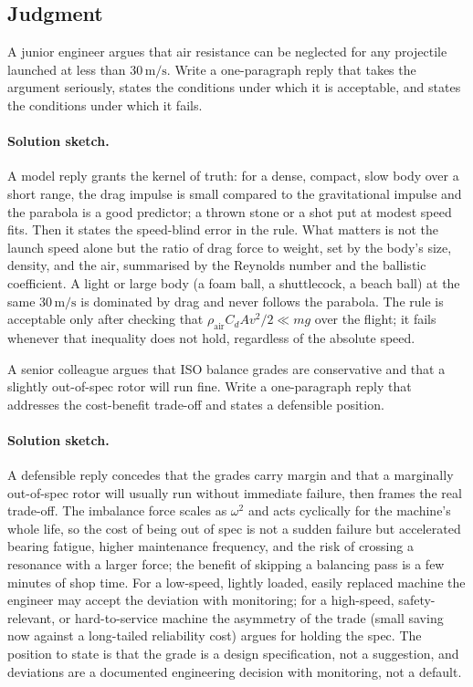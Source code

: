 \subsection*{Judgment}

\begin{exercise}
A junior engineer argues that air resistance can be neglected for any
projectile launched at less than $30\,\si{\meter\per\second}$. Write
a one-paragraph reply that takes the argument seriously, states the
conditions under which it is acceptable, and states the conditions
under which it fails.
\paragraph{Solution sketch.} A model reply grants the kernel of truth:
for a dense, compact, slow body over a short range, the drag impulse
is small compared to the gravitational impulse and the parabola is a
good predictor; a thrown stone or a shot put at modest speed fits.
Then it states the speed-blind error in the rule. What matters is not
the launch speed alone but the ratio of drag force to weight, set by
the body's size, density, and the air, summarised by the Reynolds
number and the ballistic coefficient. A light or large body (a foam
ball, a shuttlecock, a beach ball) at the same $30\,\si{\meter\per
\second}$ is dominated by drag and never follows the parabola. The
rule is acceptable only after checking that $\rho_{\text{air}}C_{d}A
v^{2}/2\ll mg$ over the flight; it fails whenever that inequality does
not hold, regardless of the absolute speed.
\end{exercise}

\begin{exercise}
A senior colleague argues that ISO balance grades are conservative
and that a slightly out-of-spec rotor will run fine. Write a
one-paragraph reply that addresses the cost-benefit trade-off and
states a defensible position.
\paragraph{Solution sketch.} A defensible reply concedes that the
grades carry margin and that a marginally out-of-spec rotor will
usually run without immediate failure, then frames the real
trade-off. The imbalance force scales as $\omega^{2}$ and acts
cyclically for the machine's whole life, so the cost of being out of
spec is not a sudden failure but accelerated bearing fatigue, higher
maintenance frequency, and the risk of crossing a resonance with a
larger force; the benefit of skipping a balancing pass is a few
minutes of shop time. For a low-speed, lightly loaded, easily replaced
machine the engineer may accept the deviation with monitoring; for a
high-speed, safety-relevant, or hard-to-service machine the asymmetry
of the trade (small saving now against a long-tailed reliability cost)
argues for holding the spec. The position to state is that the grade
is a design specification, not a suggestion, and deviations are a
documented engineering decision with monitoring, not a default.
\end{exercise}

